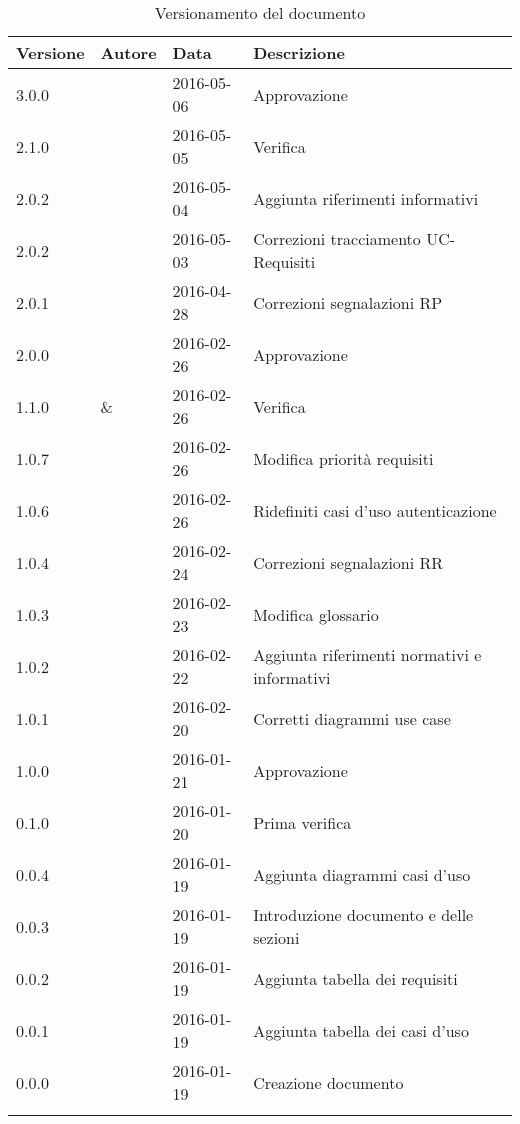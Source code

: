 \documentclass[12pt,a4paper]{article}
\begin{document}
\begin{center}
	\begin{longtable}[H]{p{} p{} p{} p{}}
		\toprule
		\textbf{Versione}	&	\textbf{Autore}	&	\textbf{Data}	&	\textbf{Descrizione}\\*
		\midrule
		\midrule
		3.0.0 & \WS{} & 2016-05-06 & Approvazione \\*
		\midrule
		2.1.0 & \AVI{} & 2016-05-05 & Verifica \\*
		\midrule
		2.0.2 & \AVE{} & 2016-05-04 & Aggiunta riferimenti informativi \\*
		\midrule
		2.0.2 & \AVE{} & 2016-05-03 & Correzioni tracciamento UC-Requisiti \\*
		\midrule
		2.0.1 & \TP{} & 2016-04-28 & Correzioni segnalazioni RP \\*
		\midrule
		2.0.0 & \AB{} & 2016-02-26 & Approvazione \\*
		\midrule
		1.1.0 & \AVE{} \& \AVI{} & 2016-02-26 & Verifica \\*
		\midrule
		1.0.7 & \NDC{} & 2016-02-26 & Modifica priorità requisiti \\*
		\midrule
        1.0.6 & \TP{} & 2016-02-26 & Ridefiniti casi d'uso autenticazione \\*
		\midrule
		1.0.4 & \NDC{} & 2016-02-24 &  Correzioni segnalazioni RR \\*
		\midrule
		1.0.3 & \IB{} & 2016-02-23 &  Modifica glossario \\*
		\midrule
		1.0.2 & \IB{} & 2016-02-22 &  Aggiunta riferimenti normativi e informativi \\*
		\midrule
		1.0.1 & \NDC{} & 2016-02-20 &  Corretti diagrammi use case \\*
		\midrule
		1.0.0 & \NDC{} & 2016-01-21 &  Approvazione \\*
		\midrule
		0.1.0 & \AVI{} & 2016-01-20 &  Prima verifica \\*
		\midrule
		0.0.4 & \TP{} & 2016-01-19 & Aggiunta diagrammi casi d'uso\\*
		\midrule
		0.0.3 & \AVE{} & 2016-01-19 &  Introduzione documento e delle sezioni  \\*
		\midrule
		0.0.2 & \AB{} & 2016-01-19 &  Aggiunta tabella dei requisiti \\*
		\midrule
		0.0.1 & \WS{} & 2016-01-19 &  Aggiunta tabella dei casi d'uso \\*
		\midrule
		0.0.0 & \NDC{} & 2016-01-19 &  Creazione documento \\*
		\bottomrule
		\caption{Versionamento del documento}
		\label{tabVers1}
	\end{longtable}
\end{center}
\end{document}
